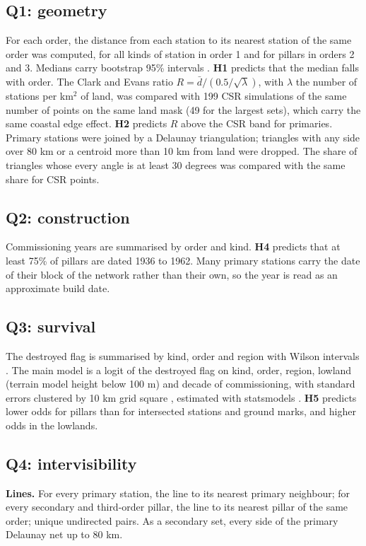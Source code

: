 \documentclass[11pt,a4paper]{article}
\begin{document}
\subsection{Q1: geometry}
For each order, the distance from each station to its nearest station of the same order was computed, for all kinds of station in order 1 and for pillars in orders 2 and 3. Medians carry bootstrap 95\% intervals \citep{efron1979}. \textbf{H1} predicts that the median falls with order. The Clark and Evans ratio $R = \bar d / (0.5/\sqrt{\lambda})$, with $\lambda$ the number of stations per km$^2$ of land, was compared with 199 CSR simulations of the same number of points on the same land mask (49 for the largest sets), which carry the same coastal edge effect. \textbf{H2} predicts $R$ above the CSR band for primaries. Primary stations were joined by a Delaunay triangulation; triangles with any side over 80 km or a centroid more than 10 km from land were dropped. The share of triangles whose every angle is at least 30 degrees was compared with the same share for CSR points.

\subsection{Q2: construction}
Commissioning years are summarised by order and kind. \textbf{H4} predicts that at least 75\% of pillars are dated 1936 to 1962. Many primary stations carry the date of their block of the network rather than their own, so the year is read as an approximate build date.

\subsection{Q3: survival}
The destroyed flag is summarised by kind, order and region with Wilson intervals \citep{wilson1927}. The main model is a logit of the destroyed flag on kind, order, region, lowland (terrain model height below 100 m) and decade of commissioning, with standard errors clustered by 10 km grid square \citep{cameron2015}, estimated with statsmodels \citep{seabold2010}. \textbf{H5} predicts lower odds for pillars than for intersected stations and ground marks, and higher odds in the lowlands.

\subsection{Q4: intervisibility}
\textbf{Lines.} For every primary station, the line to its nearest primary neighbour; for every secondary and third-order pillar, the line to its nearest pillar of the same order; unique undirected pairs. As a secondary set, every side of the primary Delaunay net up to 80 km.
\end{document}
